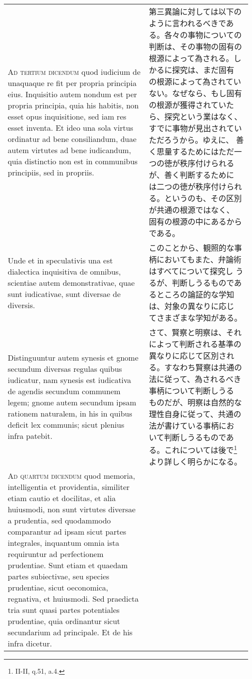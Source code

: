 \documentclass[10pt]{jsarticle}
\begin{document}
\begin{longtable}{p{21em}p{21em}}
\\

{\scshape Ad tertium dicendum} quod iudicium de unaquaque re fit per
propria principia eius. Inquisitio autem nondum est per propria
principia, quia his habitis, non esset opus inquisitione, sed iam res
esset inventa. Et ideo una sola virtus ordinatur ad bene consiliandum,
duae autem virtutes ad bene iudicandum, quia distinctio non est in
communibus principiis, sed in propriis.

&

第三異論に対しては以下のように言われるべきである。各々の事物についての
判断は、その事物の固有の根源によって為される。しかるに探究は、まだ固有
の根源によって為されていない。なぜなら、もし固有の根源が獲得されていた
ら、探究という業はなく、すでに事物が見出されていただろうから。ゆえに、
善く思量するためにはただ一つの徳が秩序付けられるが、善く判断するために
は二つの徳が秩序付けられる。というのも、その区別が共通の根源ではなく、
固有の根源の中にあるからである。

\\

Unde et in speculativis una est dialectica inquisitiva de omnibus,
scientiae autem demonstrativae, quae sunt iudicativae, sunt diversae
de diversis.

&

このことから、観照的な事柄においてもまた、弁論術はすべてについて探究し
うるが、判断しうるものであるところの論証的な学知は、対象の異なりに応じ
てさまざまな学知がある。

\\

Distinguuntur autem synesis et gnome secundum diversas regulas quibus
iudicatur, nam synesis est iudicativa de agendis secundum communem
legem; gnome autem secundum ipsam rationem naturalem, in his in quibus
deficit lex communis; sicut plenius infra patebit.

&

さて、賢察と明察は、それによって判断される基準の異なりに応じて区別され
る。すなわち賢察は共通の法に従って、為されるべき事柄について判断しうる
ものだが、明察は自然的な理性自身に従って、共通の法が書けている事柄にお
いて判断しうるものである。これについては後で\footnote{II-II, q.51,
a.4.}より詳しく明らかになる。

\\

{\scshape Ad quartum dicendum} quod memoria, intelligentia et
providentia, similiter etiam cautio et docilitas, et alia huiusmodi,
non sunt virtutes diversae a prudentia, sed quodammodo comparantur ad
ipsam sicut partes integrales, inquantum omnia ista requiruntur ad
perfectionem prudentiae. Sunt etiam et quaedam partes subiectivae, seu
species prudentiae, sicut oeconomica, regnativa, et huiusmodi. Sed
praedicta tria sunt quasi partes potentiales prudentiae, quia
ordinantur sicut secundarium ad principale. Et de his infra dicetur.


\end{longtable}
\end{document}
